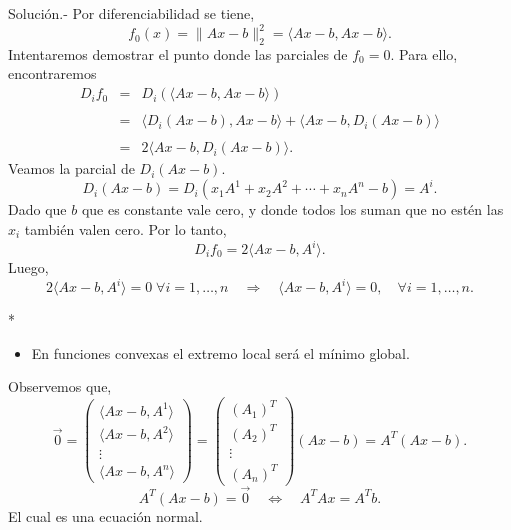 \begin{paracol}{2}
\begin{ejem}
\switchcolumn[0]
    Solución.-\; Por diferenciabilidad se tiene,
    $$f_0(x)=\|Ax-b\|_2^2 = \langle Ax-b,Ax-b\rangle.$$
    Intentaremos demostrar el punto donde las parciales de $f_0=0$. Para ello, encontraremos 
    $$
    \begin{array}{rcl}
	D_if_0&=&D_i\left(\langle Ax-b, Ax-b\rangle\right)\\\\
	      &=&\langle D_i\left(Ax-b\right),Ax-b\rangle+\langle Ax-b,D_i\left(Ax-b\right)\rangle\\\\
	      &=& 2\langle Ax-b,D_i\left(Ax-b\right)\rangle.
    \end{array}
    $$
    Veamos la parcial de $D_i\left(Ax-b\right)$.
    $$ D_i\left(Ax-b\right)=D_i\left(x_1A^1+x_2A^2+\cdots+x_nA^n-b\right)=A^i.$$
    Dado que $b$ que es constante vale cero, y donde todos los suman que no estén las $x_i$ también valen cero.
    Por lo tanto,
    $$D_if_0 = 2\langle Ax-b,A^i \rangle.$$
    Luego, 
    $$2\langle Ax-b,A^i \rangle = 0 \; \forall i=1,\ldots,n \quad \Rightarrow \quad \langle Ax-b,A^i\rangle=0,\quad \forall i = 1,\ldots,n.$$

\switchcolumn[1]*{\scriptsize
    \begin{itemize}
	\item En funciones convexas el extremo local será el mínimo global.
    \end{itemize}
}
\switchcolumn[0]\noindent
	Observemos que,
	$$
	\overrightarrow{0} = 
	\begin{pmatrix}
	    \langle Ax-b,A^1\rangle\\
	    \langle Ax-b,A^2\rangle\\
	    \vdots\\
	    \langle Ax-b,A^n\rangle
	\end{pmatrix}
	=
	\begin{pmatrix}
	    (A_1)^T\\
	    (A_2)^T\\
	    \vdots\\
	    (A_n)^T
	\end{pmatrix}
	(Ax-b)
	=A^T(Ax-b).
	$$
	$$A^T(Ax-b)=\overrightarrow{0}\quad \Leftrightarrow\quad A^TAx=A^Tb.$$
	El cual es una ecuación normal.


\end{ejem}
\end{paracol}
